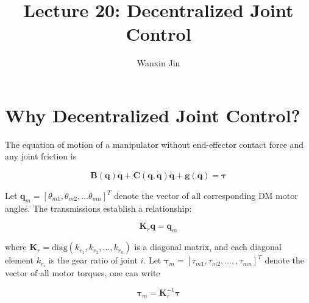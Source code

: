 \documentclass[10pt]{article}
\begin{document}
\title{Lecture 20: Decentralized Joint Control}
\author{Wanxin Jin}
\maketitle


\section{Why Decentralized Joint Control?}

The equation of motion of a manipulator without  end-effector contact force and  any joint friction is

\begin{equation}\label{equ.dyn}
    \boldsymbol{B}(\boldsymbol{q}) \ddot{\boldsymbol{q}}+\boldsymbol{C}(\boldsymbol{q}, \dot{\boldsymbol{q}}) \dot{\boldsymbol{q}}+\boldsymbol{g}(\boldsymbol{q})=\boldsymbol{\tau}
\end{equation}


Let $\boldsymbol{q}_{m}=[\theta_{m1}, \theta_{m2}, ...\theta_{mn}]^T$ denote the vector of all corresponding DM motor angles. The transmissions establish a relationship:

\begin{equation}\label{equ.motor_angle}
    \boldsymbol{K}_{r} \boldsymbol{q}=\boldsymbol{q}_{m}
\end{equation}

where $\boldsymbol{K}_{r}=\text{diag}(k_{r_1}, k_{r_2}, ..., k_{r_n})$ is a diagonal matrix, and each diagonal element $k_{r_i}$ is the gear ratio of joint $i$. Let $\boldsymbol{\tau}_{m}=[\tau_{m1},\tau_{m2},...,,\tau_{mn}]^T$ denote the vector of all motor torques, one can write

\begin{equation}\label{equ.motor_torque}
\boldsymbol{\tau}_{m}=\boldsymbol{K}_{r}^{-1} \boldsymbol{\tau}
\end{equation}
\end{document}
